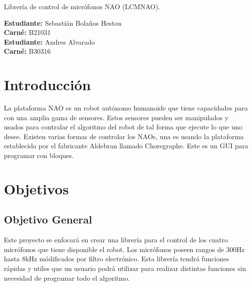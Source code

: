 \documentclass[letterpaper]{article}
\begin{document}
\vspace*{2cm}

\begin{center}
\Huge
Librería de control de micrófonos NAO (LCMNAO).
\vspace*{1cm}
\end{center}

\noindent
\small\baselineskip=14pt
\textbf{Estudiante:} Sebastián Bolaños Heston\\
\textbf{Carné:} B21031\\
\textbf{Estudiante:} Andres Alvarado\\
\textbf{Carné:} B30316\\
\section{Introducción}

La plataforma NAO es un robot autónomo humanoide que tiene capacidades para con una amplia gama de sensores. Estos sensores pueden ser manipulados y usados para contralar el algoritmo del robot de tal forma que ejecute lo que uno desee. Existen varias formas de controlar los NAOs, una es usando la plataforma establecida por el fabricante Aldebran llamado Choregraphe. Este es un GUI para programar con bloques.

\section{Objetivos}

\subsection{Objetivo General}

Este proyecto se enfocará en crear una librería para el control de los cuatro micrófonos que tiene disponible el robot. Los micrófonos poseen rangos de 300Hz hasta 8kHz módificados por filtro electrónico. Esta librería tendrá funciones rápidas y utiles que un usuario podrá utilizar para realizar distintas funciones sin necesidad de programar todo el algoritmo.
\end{document}
